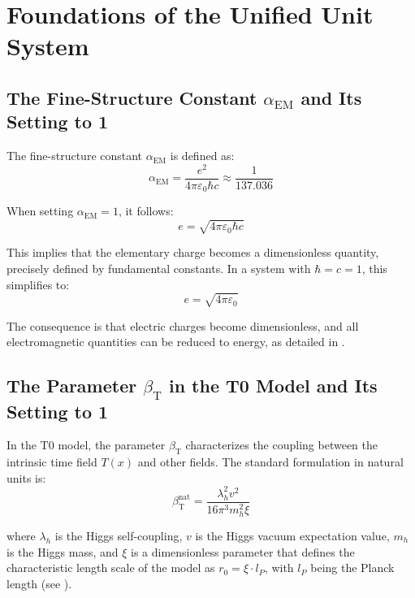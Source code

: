 \documentclass[12pt,a4paper]{article}
\newcommand{\Tfield}{T(x)}
\newcommand{\alphaEM}{\alpha_{\text{EM}}}
\newcommand{\betaT}{\beta_{\text{T}}}
\begin{document}
	\section{Foundations of the Unified Unit System}
	\label{sec:foundations}
	
	\subsection{The Fine-Structure Constant \(\alphaEM\) and Its Setting to 1}
	\label{subsec:alpha_one}
	
	The fine-structure constant \(\alphaEM\) is defined as:
	\begin{equation}
		\alphaEM = \frac{e^2}{4\pi\varepsilon_0 \hbar c} \approx \frac{1}{137.036}
	\end{equation}
	
	When setting \(\alphaEM = 1\), it follows:
	\begin{equation}
		e = \sqrt{4\pi\varepsilon_0 \hbar c}
	\end{equation}
	
	This implies that the elementary charge becomes a dimensionless quantity, precisely defined by fundamental constants. In a system with \(\hbar = c = 1\), this simplifies to:
	\begin{equation}
		e = \sqrt{4\pi\varepsilon_0}
	\end{equation}
	
	The consequence is that electric charges become dimensionless, and all electromagnetic quantities can be reduced to energy, as detailed in \cite{pascher_alpha_2025}.
	
	\subsection{The Parameter \(\betaT\) in the T0 Model and Its Setting to 1}
	\label{subsec:beta_one}
	
	In the T0 model, the parameter \(\betaT\) characterizes the coupling between the intrinsic time field \(\Tfield\) and other fields. The standard formulation in natural units is:
	\begin{equation}
		\betaT^{\text{nat}} = \frac{\lambda_h^2 v^2}{16\pi^3 m_h^2 \xi}
	\end{equation}
	
	where \(\lambda_h\) is the Higgs self-coupling, \(v\) is the Higgs vacuum expectation value, \(m_h\) is the Higgs mass, and \(\xi\) is a dimensionless parameter that defines the characteristic length scale of the model as \(r_0 = \xi \cdot l_P\), with \(l_P\) being the Planck length (see \cite{pascher_params_2025}).
	
\end{document}
